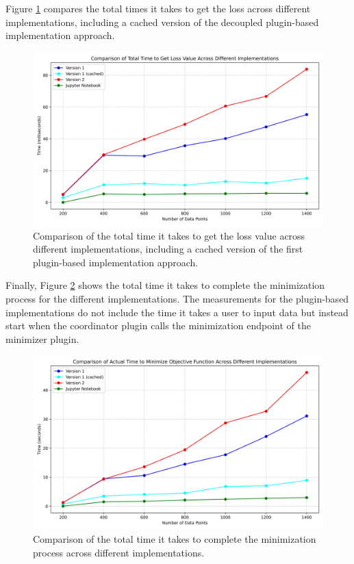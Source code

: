 \documentclass[
  a4paper,  %
  twoside,  %
  bibliography=totoc,
  headsepline,
  cleardoublepage=empty,
  parskip=half,
  draft=false
]{scrbook}
\begin{document}
Figure \ref{fig:coparison_of_of_cached} compares the total times it takes to get the loss across different implementations, including a cached version of the decoupled plugin-based implementation approach.

\begin{figure}
  \centering
  \includegraphics[width=\textwidth]{graphics/comparison_of_of_cached.png}
  \caption[Total times to get loss value compared including cached approach]{Comparison of the total time it takes to get the loss value across different implementations, including a cached version of the first plugin-based implementation approach.}
  \label{fig:coparison_of_of_cached}
\end{figure}

Finally, Figure \ref{fig:time_for_minimization} shows the total time it takes to complete the minimization process for the different implementations.
The measurements for the plugin-based implementations do not include the time it takes a user to input data but instead start when the coordinator plugin calls the minimization endpoint of the minimizer plugin.

\begin{figure}
  \centering
  \includegraphics[width=\textwidth]{graphics/time_for_minimization.png}
  \caption[Times to minimize a loss function compared]{Comparison of the total time it takes to complete the minimization process across different implementations.}
  \label{fig:time_for_minimization}
\end{figure}
\end{document}
